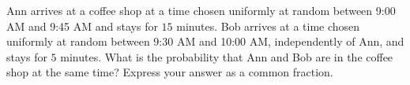 Ann arrives at a coffee shop at a time chosen uniformly at random between 9:00 AM and 9:45 AM and stays for $15$ minutes. Bob arrives at a time chosen uniformly at random between 9:30 AM and 10:00 AM, independently of Ann, and stays for $5$ minutes. What is the probability that Ann and Bob are in the coffee shop at the same time? Express your answer as a common fraction.
